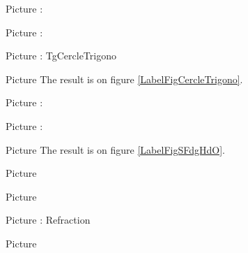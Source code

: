 

Picture : 
\begin{center}
   
\end{center}


Picture : 
\begin{center}
   
\end{center}

Picture : TgCercleTrigono
\begin{center}
   
\end{center}

\clearpage

Picture 
The result is on figure \ref{LabelFigCercleTrigono}. %
\newcommand{\CaptionFigCercleTrigono}{<+Type your caption here+>}




Picture : 
\begin{center}
   
\end{center}


Picture : 
\begin{center}
   
\end{center}

\clearpage


Picture 
The result is on figure \ref{LabelFigSFdgHdO}. %
\newcommand{\CaptionFigSFdgHdO}{<+Type your caption here+>}


\clearpage

       Picture 
   \begin{center}

   \end{center}



       Picture 
   \begin{center}

   \end{center}



Picture : Refraction
\begin{center}
   
\end{center}



Picture 
\newcommand{\CaptionFigOMPAooMbyOIqeA}{Marks are correct.}


